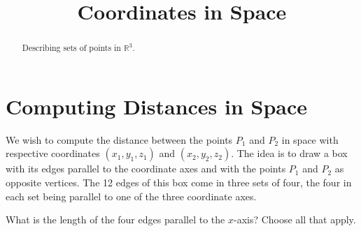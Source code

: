 \documentclass{ximera}
\title{Coordinates in Space}
\begin{document}
\begin{abstract}
Describing sets of points in $\mathbb{R}^3$.
\end{abstract}
\maketitle

 
 




\section*{Computing Distances in Space}
We wish to compute the distance between the points $P_1$ and $P_2$ in space with respective coordinates $(x_1, y_1, z_1)$ and $(x_2, y_2, z_2)$. The idea is to draw a box with its edges parallel to the coordinate axes and with the points $P_1$ and $P_2$ as opposite vertices. The 12 edges of this box come in three sets of four, the four in each set being parallel to one of the three coordinate axes. 

\begin{question} \label{Q324tgtgt}
What is the length of the four edges parallel to the $x$-axis? Choose all that apply. 
\begin{selectAll}
\end{selectAll}
\end{question}
\end{document}
